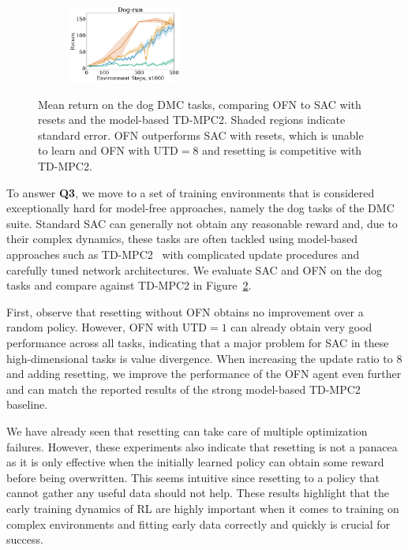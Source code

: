 \begin{figure}[t]
    \hspace{-5pt}
    \begin{subfigure}[t]{0.25\textwidth}
        \centering
        \includegraphics[width=3.7cm, trim=1.2cm 0 0 0 ,clip]{figures/dissecting/dog_exp/dog-run.pdf}
        \label{subfig:dog_run}
    \end{subfigure}%
    \hspace{-20pt}
    \caption{Mean return on the dog DMC tasks, comparing OFN to SAC with resets and the model-based TD-MPC2. Shaded regions indicate standard error. OFN outperforms SAC with resets, which is unable to learn and OFN with $\mathrm{UTD}=8$ and resetting is competitive with TD-MPC2.}
    \label{fig:all_dog}
\end{figure}

To answer \textbf{Q3}, we move to a set of training environments that is considered exceptionally hard for model-free approaches, namely the dog tasks of the DMC suite. Standard SAC can generally not obtain any reasonable reward and, due to their complex dynamics, these tasks are often tackled using model-based approaches such as TD-MPC2~\parencite{hansen2024tdmpc} with complicated update procedures and carefully tuned network architectures. We evaluate SAC and OFN on the dog tasks and compare against TD-MPC2 in Figure~\ref{fig:all_dog}.

First, observe that resetting without OFN obtains no improvement over a random policy. However, OFN with $\mathrm{UTD}=1$ can already obtain very good performance across all tasks, indicating that a major problem for SAC in these high-dimensional tasks is value divergence. When increasing the update ratio to $8$ and adding resetting, we improve the performance of the OFN agent even further and can match the reported results of the strong model-based TD-MPC2 baseline. 

We have already seen that resetting can take care of multiple optimization failures. However, these experiments also indicate that resetting is not a panacea as it is only effective when the initially learned policy can obtain some reward before being overwritten. 
This seems intuitive since resetting to a policy that cannot gather any useful data should not help. 
These results highlight that the early training dynamics of RL are highly important when it comes to training on complex environments and fitting early data correctly and quickly is crucial for success. 


